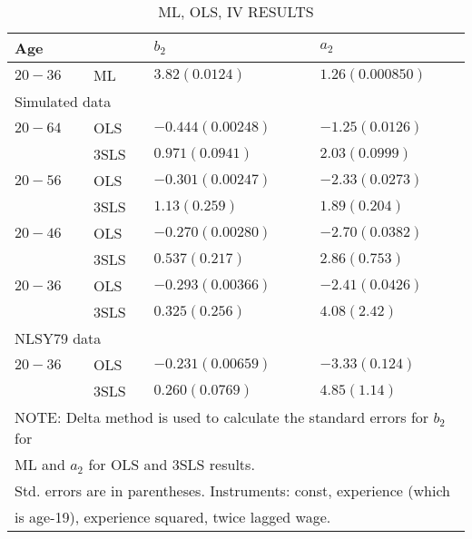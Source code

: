 
%

\begin{center}
  \hypertarget{OLSIV}{}
  \begin{table}
  \centering
    \caption{ \label{tab:OLSIV} \\
      \scriptsize ML, OLS, IV RESULTS}
    \begin{tabular}{llll}
\hline Age & & $b_2$ & $a_2$ \\
\hline $20-36$ & ML & $3.82(0.0124)$ & $1.26(0.000850)$ \\
\multicolumn{2}{l}{ Simulated data } & & \\
$20-64$ & OLS & $-0.444(0.00248)$ & $-1.25(0.0126)$ \\
& 3SLS & $0.971(0.0941)$ & $2.03(0.0999)$ \\
$20-56$ & OLS & $-0.301(0.00247)$ & $-2.33(0.0273)$ \\
& 3SLS & $1.13(0.259)$ & $1.89(0.204)$ \\
$20-46$ & OLS & $-0.270(0.00280)$ & $-2.70(0.0382)$ \\
& 3SLS & $0.537(0.217)$ & $2.86(0.753)$ \\
$20-36$ & OLS & $-0.293(0.00366)$ & $-2.41(0.0426)$ \\
& 3SLS & $0.325(0.256)$ & $4.08(2.42)$ \\
\multicolumn{2}{l}{ NLSY79 data } & & \\
$20-36$ & OLS & $-0.231(0.00659)$ & $-3.33(0.124)$ \\
& 3SLS & $0.260(0.0769)$ & $4.85(1.14)$ \\
      \hline
      \multicolumn{4}{l}{NOTE: Delta method is used to calculate the standard errors for $b_2$ for}\\
      \multicolumn{4}{l}{ML and $a_2$ for OLS and 3SLS results.}\\
      \multicolumn{4}{l}{Std. errors are in parentheses. Instruments: const, experience (which}\\
      \multicolumn{4}{l}{is age-19), experience squared, twice lagged wage.}\\
  \end{tabular}
  \end{table}
\end{center}

%
